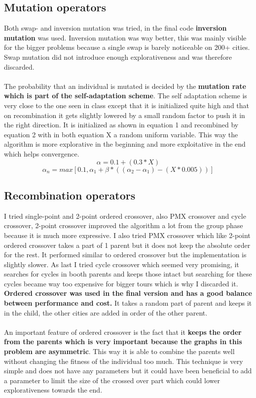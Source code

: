 \documentclass[a4paper,10pt]{article}
\begin{document}
\subsection{Mutation operators}
\label{mut}
Both swap- and inversion mutation was tried, in the final code \textbf{inversion mutation} was used. Inversion mutation was way better, this was mainly visible for the bigger problems because a single swap is barely noticeable on 200+ cities. Swap mutation did not introduce enough explorativeness and was therefore discarded. 
\\\\
The probability that an individual is mutated is decided by the \textbf{mutation rate which is part of the self-adaptation scheme}. The self adaptation scheme is very close to the one seen in class except that it is initialized quite high and that on recombination it gets slightly lowered by a small random factor to push it in the right direction. It is initialized as shown in equation 1 and recombined by equation 2 with in both equation X a random uniform variable. This way the algorithm is more explorative in the beginning and more exploitative in the end which helps convergence.
\begin{equation}
	\alpha = 0.1 + (0.3 * X)
\end{equation}
\begin{equation}
	\alpha_n = max[0.1, \alpha_1 + \beta * ((\alpha_2 - \alpha_1) - (X*0.005))]
\end{equation}

\subsection{Recombination operators}
\label{recomb}
I tried single-point and 2-point ordered crossover, also PMX crossover and cycle crossover, 2-point crossover improved the algorithm a lot from the group phase because it is much more expressive. I also tried PMX crossover which like 2-point ordered crossover takes a part of 1 parent but it does not keep the absolute order for the rest. It performed similar to ordered crossover but the implementation is slightly slower. As last I tried cycle crossover which seemed very promising, it searches for cycles in booth parents and keeps those intact but searching for these cycles became way too expensive for bigger tours which is why I discarded it. \textbf{Ordered crossover was used in the final version and has a good balance between performance and cost.} It takes a random part of parent and keeps it in the child, the other cities are added in order of the other parent.
\\\\
An important feature of ordered crossover is the fact that it \textbf{keeps the order from the parents which is very important because the graphs in this problem are asymmetric}. This way it is able to combine the parents well without changing the fitness of the individual too much. This technique is very simple and does not have any parameters but it could have been beneficial to add a parameter to limit the size of the crossed over part which could lower explorativeness towards the end.
\end{document}
